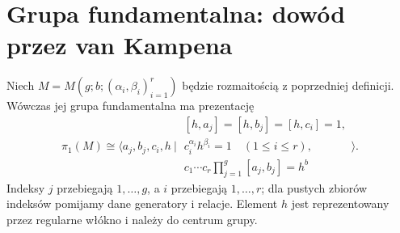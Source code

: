 \section{Grupa fundamentalna: dowód przez van Kampena}
\label{sec:tg-seifert-pi1}

\begin{twierdzenie}
\label{thm:tg-seifert-presentation}
Niech $M=M(g;b;(\alpha_i,\beta_i)_{i=1}^r)$ będzie
rozmaitością z poprzedniej definicji. Wówczas jej grupa
fundamentalna ma prezentację
\[
\pi_1(M)\cong\Big\langle a_j,b_j,c_i,h\ \Big|\
\begin{array}{l}
[h,a_j]=[h,b_j]=[h,c_i]=1,\\
c_i^{\alpha_i}h^{\beta_i}=1\quad (1\leq i\leq r),\\
c_1\cdots c_r\prod_{j=1}^g[a_j,b_j]=h^b
\end{array}\Big\rangle.
\]
Indeksy $j$ przebiegają $1,\ldots,g$, a $i$ przebiegają
$1,\ldots,r$; dla pustych zbiorów indeksów pomijamy
dane generatory i relacje. Element $h$ jest reprezentowany
przez regularne włókno i należy do centrum grupy.
\end{twierdzenie}


